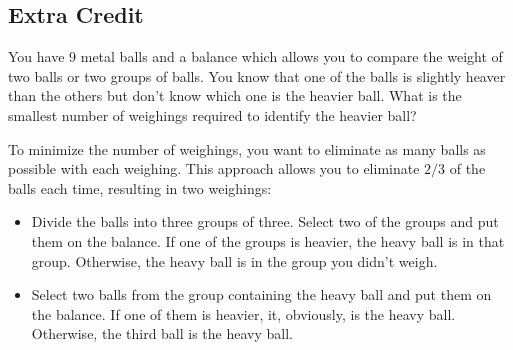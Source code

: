 \documentclass[fleqn,addpoints]{exam}
\begin{document}
\begin{questions}

\section{Extra Credit}

\question

You have 9 metal balls and a balance which allows you to compare the weight of two balls or two groups of balls.  You know
that one of the balls is slightly heaver than the others but don't know which one is the heavier ball.  What is the
smallest number of weighings required to identify the heavier ball?

\begin{solution}
  To minimize the number of weighings, you want to eliminate as many balls as possible with each weighing.  This
  approach allows you to eliminate \(2/3\) of the balls each time, resulting in two weighings:

  \begin{itemize}
    \item 
      Divide the balls into three groups of three.  Select two of the groups and put them on the balance.  If one of
      the groups is heavier, the heavy ball is in that group.  Otherwise, the heavy ball is in the group you didn't
      weigh.

    \item 
      Select two balls from the group containing the heavy ball and put them on the balance.  If one of them is heavier,
      it, obviously, is the heavy ball.  Otherwise, the third ball is the heavy ball. 
  \end{itemize}


\end{solution}
\end{questions}
\end{document}
